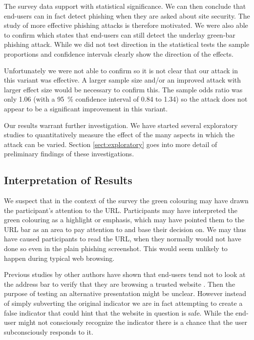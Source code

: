 \documentclass[twoside,letterpaper]{soups}
\begin{document}
The survey data support  with statistical significance. We can then conclude that end-users can in fact detect phishing when they are asked about site security. The study of more effective phishing attacks is therefore motivated.
We were also able to confirm  which states that end-users can still detect the underlay green-bar phishing attack. %
While we did not test direction in the statistical tests the sample proportions and confidence intervals clearly show the direction of the effects.

Unfortunately we were not able to confirm  so it is not clear that our attack in this variant was effective. A larger sample size and/or an improved attack with larger effect size would be necessary to confirm this. The sample odds ratio was only 1.06 (with a 95~\% confidence interval of 0.84 to 1.34) so the attack does not appear to be a significant improvement in this variant.

Our results warrant further investigation. We have started several exploratory studies to quantitatively measure the effect of the many aspects in which the attack can be varied. Section \ref{sect:exploratory} goes into more detail of preliminary findings of these investigations.

\subsection{Interpretation of Results}

We suspect that in the context of the survey the green colouring may have drawn the participant's attention to the URL. Participants may have interpreted the green colouring as a highlight or emphasis, which may have pointed them to the URL bar as an area to pay attention to and base their decision on. We may thus have caused participants to read the URL, when they normally would not have done so even in the plain phishing screenshot. This would seem unlikely to happen during typical web browsing.


Previous studies by other authors have shown that end-users tend not to look at the address bar to verify that they are browsing a trusted website \cite{emperor}. Then the purpose of testing an alternative presentation might be unclear. However instead of simply subverting the original indicator we are in fact attempting to create a false indicator that could hint that the website in question is safe. While the end-user might not consciously recognize the indicator there is a chance that the user subconsciously responds to it.
\end{document}
